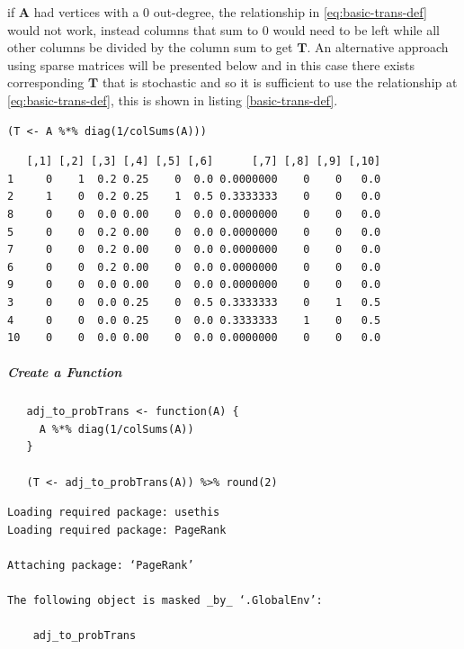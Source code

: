 \documentclass[11pt]{article}
\begin{document}
if \(\mathbf{A}\) had vertices with a 0 out-degree, the relationship in \eqref{eq:basic-trans-def} would not work, instead columns that sum to 0 would
need to be left while all other columns be divided by the column sum to get
\(\mathbf{T}\). An alternative approach using sparse matrices will be presented
below and in this case there exists corresponding \(\mathbf{T}\) that is
stochastic and so it is sufficient to use the relationship at
\eqref{eq:basic-trans-def}, this is shown in listing \ref{basic-trans-def}.

\begin{listing}[htbp]
\begin{verbatim}
(T <- A %*% diag(1/colSums(A)))

\end{verbatim}
\caption{\label{basic-trans-def}Solve the Transition Probability Matrix by scaling each column to 1 using matrix multiplication.}
\end{listing}

\begin{verbatim}
   [,1] [,2] [,3] [,4] [,5] [,6]      [,7] [,8] [,9] [,10]
1     0    1  0.2 0.25    0  0.0 0.0000000    0    0   0.0
2     1    0  0.2 0.25    1  0.5 0.3333333    0    0   0.0
8     0    0  0.0 0.00    0  0.0 0.0000000    0    0   0.0
5     0    0  0.2 0.00    0  0.0 0.0000000    0    0   0.0
7     0    0  0.2 0.00    0  0.0 0.0000000    0    0   0.0
6     0    0  0.2 0.00    0  0.0 0.0000000    0    0   0.0
9     0    0  0.0 0.00    0  0.0 0.0000000    0    0   0.0
3     0    0  0.0 0.25    0  0.5 0.3333333    0    1   0.5
4     0    0  0.0 0.25    0  0.0 0.3333333    1    0   0.5
10    0    0  0.0 0.00    0  0.0 0.0000000    0    0   0.0
\end{verbatim}


\subparagraph{Create a Function}
\label{create-a-function}
\begin{verbatim}
   adj_to_probTrans <- function(A) {
     A %*% diag(1/colSums(A))
   }

   (T <- adj_to_probTrans(A)) %>% round(2)
\end{verbatim}

\begin{verbatim}
Loading required package: usethis
Loading required package: PageRank

Attaching package: ‘PageRank’

The following object is masked _by_ ‘.GlobalEnv’:

    adj_to_probTrans
\end{verbatim}
\end{document}
